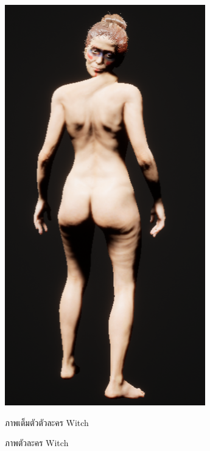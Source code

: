 \begin{figure}
\begin{subcaptionblock}{.4\textwidth}
    \includegraphics[width=.8\linewidth]{./img/characters/witch_full.png}
    \caption{ภาพเต็มตัวตัวละคร Witch}\label{ภาพตัวเต็มตัวละคร Witch}
  \end{subcaptionblock}%
  \caption{ภาพตัวละคร Witch}\label{ภาพตัวละคร Witch}
\end{figure}

